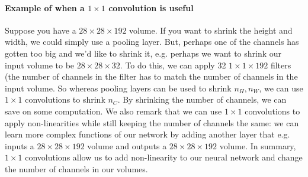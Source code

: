 \documentclass[12pt]{article}
\begin{document}
\paragraph{Example of when a $1\times 1$ convolution is useful}
 Suppose you have a $28 \times 28 \times 192$ volume. If you want to shrink the height and width, we could simply use
a pooling layer. But, perhaps one of the channels has gotten too big and we'd like to shrink it, e.g. perhaps we want to shrink
our input volume to be $28 \times 28 \times 32$. To do this, we can apply 32 $1 \times 1 \times 192$ filters (the number of channels in the filter has to match the number of channels in the input volume. So whereas pooling layers can be used to shrink $n_H, n_W$,
we can use $1 \times 1$ convolutions to shrink $n_C$. By shrinking the number of channels, we can save on some computation. We also remark that we can use $1 \times 1$ convolutions to apply non-linearities while still keeping the number of channels the same:
we can learn more complex functions of our network by adding another layer that e.g. inputs a $28 \times 28 \times 192$ volume and outputs a $28 \times 28 \times 192$ volume. In summary, $1 \times 1$ convolutions allow us to add non-linearity to our neural network and change the number of channels in our volumes.
\end{document}
